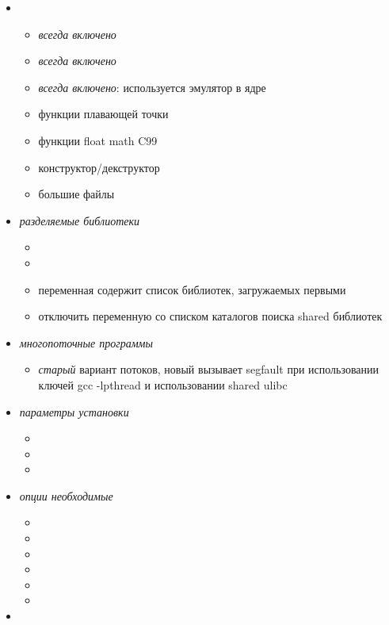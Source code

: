\begin{itemize}
\item
\begin{itemize}
\item {} \emph{всегда включено}
\item {} \emph{всегда включено}
\item {} \emph{всегда включено}: используется эмулятор в
ядре
\item {} функции плавающей точки
\item {} функции float math C99
\item {} конструктор/декструктор
\item {} большие файлы
\end{itemize}
\item \emph{разделяемые  библиотеки}
\begin{itemize}
  \item {}
  \item {} 
  \item {} переменная 
  содержит список библиотек, загружаемых первыми
  \item {} отключить
  переменную  со списком каталогов поиска shared
  библиотек
\end{itemize}
\item \emph{многопоточные  программы }
\begin{itemize}
  \item {} \emph{старый} вариант потоков, новый вызывает
  segfault при использовании ключей gcc -lpthread и использовании shared ulibc
\end{itemize}
\item \emph{параметры установки}
\begin{itemize}
\item {}
\item {}
\item {}
\end{itemize}
\item \emph{опции необходимые }
\begin{itemize}
\item {}
\item {}
\item {}
\item {}
\item {}
\item {}
\end{itemize}
\item
\begin{itemize}
\end{itemize}
\end{itemize}

